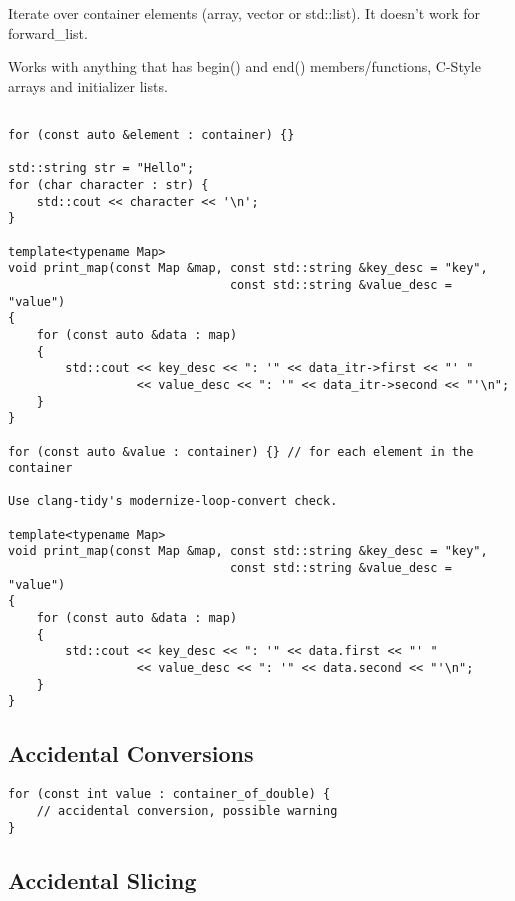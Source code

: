 \documentclass[openany]{report}
\begin{document}
Iterate over container elements (array, vector or std::list). It doesn't work for forward\_list.


Works with anything that has begin()
and end() members/functions, C-Style arrays and initializer lists.

\begin{verbatim}

for (const auto &element : container) {}

std::string str = "Hello";
for (char character : str) {
    std::cout << character << '\n';
}

template<typename Map>
void print_map(const Map &map, const std::string &key_desc = "key",
                               const std::string &value_desc = "value")
{
    for (const auto &data : map)
    {
        std::cout << key_desc << ": '" << data_itr->first << "' "
                  << value_desc << ": '" << data_itr->second << "'\n";
    }
}

for (const auto &value : container) {} // for each element in the container

Use clang-tidy's modernize-loop-convert check.

template<typename Map>
void print_map(const Map &map, const std::string &key_desc = "key",
                               const std::string &value_desc = "value")
{
    for (const auto &data : map)
    {
        std::cout << key_desc << ": '" << data.first << "' "
                  << value_desc << ": '" << data.second << "'\n";
    }
}
\end{verbatim}

\subsection{Accidental Conversions}

\begin{verbatim}
for (const int value : container_of_double) {
    // accidental conversion, possible warning
}
\end{verbatim}

\subsection{Accidental Slicing}
\end{document}
